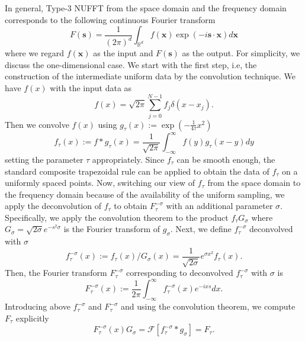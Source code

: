 In general, Type-$3$ NUFFT from the space domain and the frequency domain corresponds to the following continuous Fourier transform
\begin{equation}
    F(\bm{s})
  = \frac{1}{(2\pi)^d} \int_{\mathbb{R}^d}^{}
    f(\bm{x})\exp(-i\bm{s}\cdot\bm{x}) d\bm{x}
\end{equation}
where we regard $f(\bm{x})$ as the input and $F(\bm{s})$ as the output.
For simplicity, we discuss the one-dimensional case.
We start with the first step, i.e, the construction of the intermediate uniform data by the convolution technique.
We have $f(x)$ with the input data as
\begin{equation}
  f(x) = \sqrt{2\pi}\sum_{j=0}^{N-1}f_j\delta(x-x_j).
\end{equation}
Then we convolve $f(x)$ using $g_{\tau}(x) := \exp(-\frac{1}{4\tau}x^2)$
\begin{equation}
    f_{\tau}(x) := f\ast g_{\tau} (x)
  = \frac{1}{\sqrt{2\pi}} \int_{-\infty}^{\infty} f(y)g_{\tau}(x-y) dy
\end{equation}
setting the parameter $\tau$ appropriately.
Since $f_{\tau}$ can be smooth enough, the standard composite trapezoidal rule can be applied to obtain the data of $f_{\tau}$ on a uniformly spaced points.
Now, switching our view of $f_{\tau}$ from the space domain to the frequency domain because of the availability of the uniform sampling, we apply the deconvolution of $f_{\tau}$ to obtain $F_{\tau}^{-\sigma}$ with an additional parameter $\sigma$.
Specifically, we apply the convolution theorem to the product $f_{\tau}G_{\sigma}$
where $G_{\sigma} = \sqrt{2\sigma}e^{-s^2\sigma}$ is the Fourier transform of $g_{\sigma}$.
Next, we define $f_{\tau}^{-\sigma}$ deconvolved with $\sigma$
\begin{equation}
    f_{\tau}^{-\sigma}(x) := f_{\tau}(x)/G_{\sigma}(x)
  = \frac{1}{\sqrt{2\sigma}}e^{\sigma x^2}f_{\tau}(x).
\end{equation}
Then, the Fourier transform $F_{\tau}^{-\sigma}$ corresponding to deconvolved $f_{\tau}^{-\sigma}$ 
with $\sigma$ is
\begin{equation}
     F_{\tau}^{-\sigma}(x)
  := \frac{1}{2\pi} \int_{-\infty}^{\infty} f_{\tau}^{-\sigma}(x) e^{-ixs} dx.
\end{equation}
Introducing above $f_{\tau}^{-\sigma}$ and $F_{\tau}^{-\sigma}$ and using the convolution theorem,
we compute $F_{\tau}$ explicitly
\begin{equation}
     F_{\tau}^{-\sigma}(x)G_{\sigma}
   = \mathcal{F}[f_{\tau}^{-\sigma}\ast g_{\sigma}]
   = F_{\tau}.
\end{equation}
